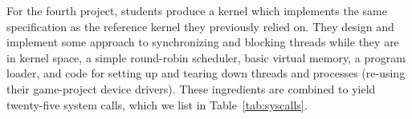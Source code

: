 For the fourth project, students %
produce a kernel which implements the
same specification as the reference kernel
they previously relied on.
They design and implement some approach to
synchronizing and blocking threads while
they are in kernel space,
a simple round-robin scheduler,
basic virtual memory,
a program loader,
and code for setting up and tearing down
threads and processes
(re-using their game-project device drivers).
These ingredients are combined to yield
twenty-five system calls,
which we list in Table~\ref{tab:syscalls}.

